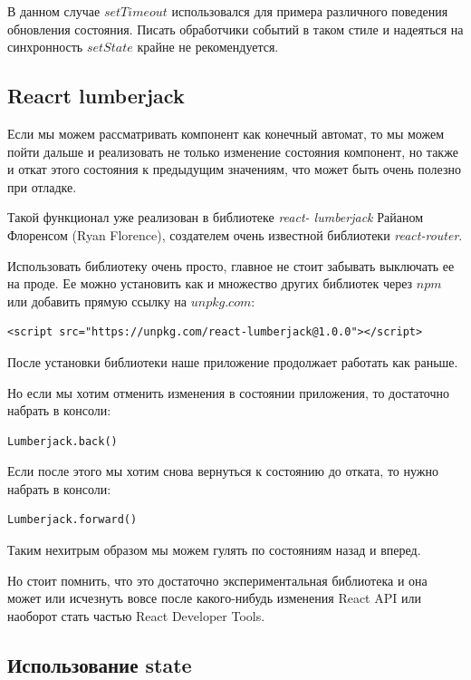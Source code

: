 В данном случае $setTimeout$ использовался для примера различного поведения обновления состояния. Писать обработчики событий в таком стиле и надеяться на синхронность $setState$ крайне не рекомендуется.

\subsection{Reacrt lumberjack}

Если мы можем рассматривать компонент как конечный автомат, то мы можем пойти дальше и реализовать не только изменение состояния компонент, но также и откат этого состояния к предыдущим значениям, что может быть очень полезно при отладке.

Такой функционал уже реализован в библиотеке \textit{react- lumberjack} Райаном Флоренсом (Ryan Florence), создателем очень известной библиотеки \textit{react-router}.

Использовать библиотеку очень просто, главное не стоит забывать выключать ее на проде.
Ее можно установить как и множество других библиотек через $npm$ или добавить прямую ссылку на $unpkg.com$:

\begin{lstlisting}
<script src="https://unpkg.com/react-lumberjack@1.0.0"></script>
\end{lstlisting}

После установки библиотеки наше приложение продолжает работать как раньше. 

Но если мы хотим отменить изменения в состоянии приложения, то достаточно набрать в консоли:

\begin{lstlisting}
Lumberjack.back()
\end{lstlisting}

Если после этого мы хотим снова вернуться к состоянию до отката, то нужно набрать в консоли:

\begin{lstlisting}
Lumberjack.forward()
\end{lstlisting}

Таким нехитрым образом мы можем гулять по состояниям назад и вперед.

Но стоит помнить, что это достаточно экспериментальная библиотека и она может или исчезнуть вовсе после какого-нибудь изменения React API или наоборот стать частью React Developer Tools.

\subsection{Использование state}

